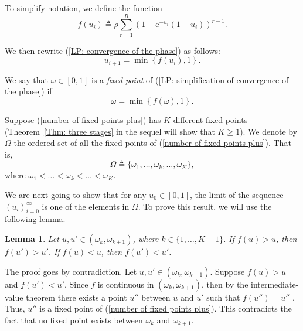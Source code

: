 \documentclass{IEEEtran}
\newtheorem{lemma}{Lemma}
\begin{document}
To simplify notation, we define the function
\begin{equation}
f(u_{i}) \triangleq \rho \sum_{r=1}^{R} \left( 1 - \mathrm{e}^{-u_{i}}(1-u_{i}) \right) ^{r-1}.
\end{equation}

We then rewrite (\ref{LP: convergence of the phase}) as follows:
\begin{equation} \label{LP: simplification of convergence of the phase}
u_{i+1}  =  \min \left\lbrace f(u_{i}), 1 \right\rbrace.
\end{equation}

We say that $\omega \in [0,1]$ is a \emph{fixed point} of (\ref{LP: simplification of convergence of the phase})
if
\begin{equation} \label{number of fixed points plus}
\omega  =  \min \left\lbrace f(\omega), 1 \right\rbrace.
\end{equation}



Suppose (\ref{number of fixed points plus}) has $K$ different fixed points (Theorem~\ref{Thm: three stages} in the sequel will show that $K \geq
1$). We denote by $\Omega$ the ordered set of all the fixed points of (\ref{number of fixed points plus}). That is,
\begin{equation}
\Omega \triangleq\{\omega_1,\ldots,\omega_k,\ldots, \omega_K\},
\end{equation}
where $\omega_1<\ldots<\omega_k<\ldots< \omega_K$.

We are next going to show that for any $u_0\in [0, 1]$, the limit of the sequence $(u_i)_{i=0}^{\infty}$ is one of the elements in $\Omega$. To
prove this result, we will use the following lemma.

\begin{lemma} \label{lemma: f(w)>w}
Let $u, u' \in (\omega_k, \omega_{k+1})$, where $k \in \{1,\ldots,K-1\}$.
If $f(u)>u$, then $f(u') > u'$. If $f(u)<u$, then $f(u') < u'$.
\end{lemma}
\begin{IEEEproof}
The proof goes by contradiction. Let $u, u' \in (\omega_k, \omega_{k+1})$. Suppose $f(u)>u$ and $f(u')<u'$. Since $f$ is continuous in $(\omega_k,
\omega_{k+1})$, then by the intermediate-value theorem there exists a point $u''$ between $u$ and $u'$ such that $f(u'') = u''$ . Thus, $u''$ is a
fixed point of (\ref{number of fixed points plus}). This contradicts the fact that no fixed point exists between $\omega_k$ and $\omega_{k+1}$.
\end{IEEEproof}
\end{document}
